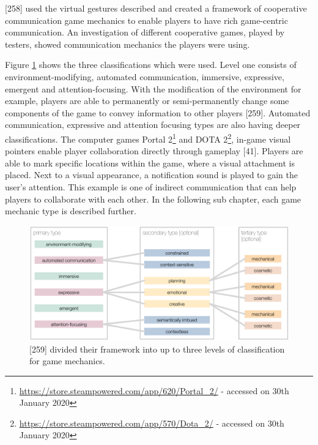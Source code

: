 \textcite{Toups2014ATheory}[258] used the virtual gestures \textcite{Cheung2012CommunicationGaming} described and created a framework of cooperative communication game mechanics to enable players to have rich game-centric communication.  
An investigation of different cooperative games, played by testers, showed communication mechanics the players were using. 

Figure \ref{fig:framework_cooperative_communication_mechanics} shows the three classifications which were used. 
Level one consists of environment-modifying, automated communication, immersive, expressive, emergent and attention-focusing. With the modification of the environment for example, players are able to permanently or semi-permanently change some components of the game to convey information to other players \textcite{Toups2014ATheory}[259]. 
Automated communication, expressive and attention focusing types are also having deeper classifications.
The computer games Portal 2\footnote{\url{https://store.steampowered.com/app/620/Portal_2/} - accessed on 30th January 2020} and DOTA 2\footnote{\url{https://store.steampowered.com/app/570/Dota_2/} - accessed on 30th January 2020}, in-game visual pointers enable player collaboration directly through gameplay \autocite{Vaddi2016Investigating2}[41]. 
Players are able to mark specific locations within the game,
where a visual attachment is placed. Next to a visual appearance, a notification sound is played to gain the user’s attention. This example is one of indirect communication that can help players to collaborate with each other.
In the following sub chapter, each game mechanic type is described further.

\begin{figure}
    \centering
    \includegraphics[scale=0.5]{images/framework_cooperative_communication_mechanics.png}
    \caption{\textcite{Toups2014ATheory}[259] divided their framework into up to three levels of classification for game mechanics.}
    \label{fig:framework_cooperative_communication_mechanics}
\end{figure}

